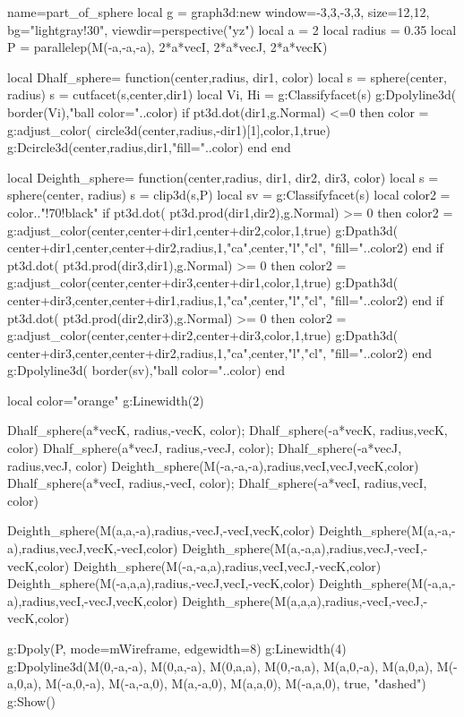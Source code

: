 \documentclass[border=5pt]{standalone}%
\begin{document}
\begin{luadraw}{name=part_of_sphere}
local g = graph3d:new{ window={-3,3,-3,3}, size={12,12}, bg="lightgray!30", viewdir=perspective("yz")}
local a = 2
local radius = 0.35
local P = parallelep(M(-a,-a,-a), 2*a*vecI, 2*a*vecJ, 2*a*vecK)

local Dhalf_sphere= function(center,radius, dir1, color)
    local s = sphere(center, radius)
    s = cutfacet(s,{center,dir1})
    local Vi, Hi = g:Classifyfacet(s)
    g:Dpolyline3d( border(Vi),"ball color="..color)
    if pt3d.dot(dir1,g.Normal) <=0 then 
        color = g:adjust_color( circle3d(center,radius,-dir1)[1],color,1,true)
        g:Dcircle3d(center,radius,dir1,"fill="..color)
    end
end

local Deighth_sphere= function(center,radius, dir1, dir2, dir3, color)
    local s = sphere(center, radius)
    s = clip3d(s,P)
    local sv = g:Classifyfacet(s)
    local color2 = color.."!70!black"
    if pt3d.dot( pt3d.prod(dir1,dir2),g.Normal) >= 0 then
        color2 = g:adjust_color({center,center+dir1,center+dir2},color,1,true)
        g:Dpath3d( {center+dir1,center,center+dir2,radius,1,"ca",center,"l","cl"}, "fill="..color2)
    end
    if pt3d.dot( pt3d.prod(dir3,dir1),g.Normal) >= 0 then
        color2 = g:adjust_color({center,center+dir3,center+dir1},color,1,true)
        g:Dpath3d( {center+dir3,center,center+dir1,radius,1,"ca",center,"l","cl"}, "fill="..color2)
    end
    if pt3d.dot( pt3d.prod(dir2,dir3),g.Normal) >= 0 then
        color2 = g:adjust_color({center,center+dir2,center+dir3},color,1,true)
        g:Dpath3d( {center+dir3,center,center+dir2,radius,1,"ca",center,"l","cl"}, "fill="..color2)
    end
    g:Dpolyline3d( border(sv),"ball color="..color)
end

local color="orange"
g:Linewidth(2)

Dhalf_sphere(a*vecK, radius,-vecK, color); Dhalf_sphere(-a*vecK, radius,vecK, color)
Dhalf_sphere(a*vecJ, radius,-vecJ, color); Dhalf_sphere(-a*vecJ, radius,vecJ, color)
Deighth_sphere(M(-a,-a,-a),radius,vecI,vecJ,vecK,color)
Dhalf_sphere(a*vecI, radius,-vecI, color); Dhalf_sphere(-a*vecI, radius,vecI, color)

Deighth_sphere(M(a,a,-a),radius,-vecJ,-vecI,vecK,color)
Deighth_sphere(M(a,-a,-a),radius,vecJ,vecK,-vecI,color)
Deighth_sphere(M(a,-a,a),radius,vecJ,-vecI,-vecK,color)
Deighth_sphere(M(-a,-a,a),radius,vecI,vecJ,-vecK,color)
Deighth_sphere(M(-a,a,a),radius,-vecJ,vecI,-vecK,color)
Deighth_sphere(M(-a,a,-a),radius,vecI,-vecJ,vecK,color)
Deighth_sphere(M(a,a,a),radius,-vecI,-vecJ,-vecK,color)

g:Dpoly(P, {mode=mWireframe, edgewidth=8})
g:Linewidth(4)
g:Dpolyline3d({{M(0,-a,-a), M(0,a,-a), M(0,a,a), M(0,-a,a)}, 
    {M(a,0,-a), M(a,0,a), M(-a,0,a), M(-a,0,-a)}, 
    {M(-a,-a,0), M(a,-a,0), M(a,a,0), M(-a,a,0)}},
    true, "dashed")
g:Show()
\end{luadraw}
\end{document}
